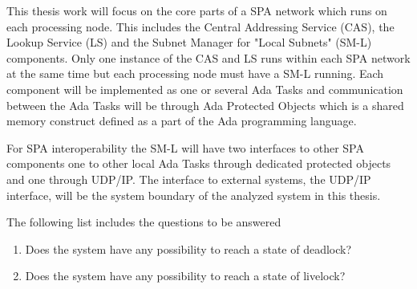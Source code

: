 

This thesis work will focus on the core parts of a SPA network which runs on
each processing node. This includes the Central Addressing Service
(CAS), the Lookup Service (LS) and the Subnet Manager for "Local Subnets"
(SM-L) components. Only one instance of the CAS and LS runs within each SPA
network at the same time but each processing node must have a SM-L running.
Each component will be implemented as one or several Ada Tasks and
communication between the Ada Tasks will be through Ada Protected Objects which
is a shared memory construct defined as a part of the Ada programming language.

For SPA interoperability the SM-L will have two interfaces to other SPA
components one to other local Ada Tasks through dedicated protected objects and
one through UDP/IP. The interface to external systems, the UDP/IP interface,
will be the system boundary of the analyzed system in this thesis.


The following list includes the questions to be answered
\begin{enumerate}
    \item Does the system have any possibility to reach a state of deadlock?
    \item Does the system have any possibility to reach a state of livelock?
\end{enumerate}

